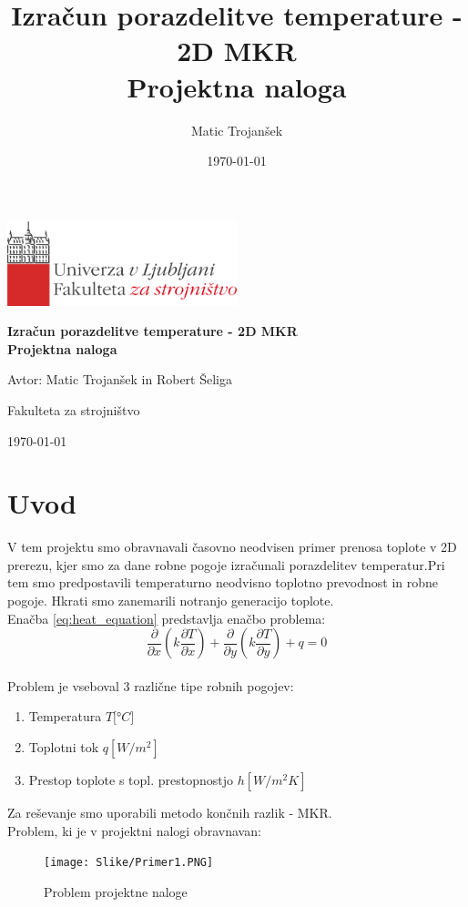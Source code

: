 \documentclass[a4paper,12pt]{article}
\title{Izračun porazdelitve temperature - 2D MKR\\Projektna naloga}
\author{Matic Trojanšek}
\date{\today}
\begin{document}
\begin{titlepage}
    \centering
    \includegraphics[width=0.5\textwidth]{Slike/ULFS_LOGO.png}\par
    \vspace{1cm}
    {\scshape\LARGE \par}
    \vspace{2cm}
    {\huge\bfseries Izračun porazdelitve temperature - 2D MKR\\Projektna naloga \par}
    \vspace{2cm}
    {\Large Avtor: Matic Trojanšek in Robert Šeliga \par}
    \vspace{0.5cm}
    {Fakulteta za strojništvo \par}
    \vfill
    {\large\today \par}
\end{titlepage}

\section{Uvod}

V tem projektu smo obravnavali časovno neodvisen primer prenosa toplote v 2D prerezu, kjer smo za dane robne pogoje izračunali porazdelitev temperatur.Pri tem smo predpostavili temperaturno neodvisno toplotno prevodnost in robne pogoje. Hkrati smo zanemarili notranjo generacijo toplote.\medskip\\
Enačba \ref{eq:heat_equation} predstavlja enačbo problema:
\begin{equation}\label{eq:heat_equation}
    \frac{\partial}{\partial x}\left(k \frac{\partial T}{\partial x}\right) + \frac{\partial}{\partial y}\left(k \frac{\partial T}{\partial y}\right) + q = 0
\end{equation}\medskip\\
Problem je vseboval 3 različne tipe robnih pogojev:
\begin{enumerate}
    \item Temperatura $T[$°$C]$
    \item Toplotni tok $q[W/m^2]$
    \item Prestop toplote s topl. prestopnostjo  $h[W/m^2K]$\medskip\\
\end{enumerate}
Za reševanje smo uporabili metodo končnih razlik - MKR.\medskip\\
Problem, ki je v projektni nalogi obravnavan:
\begin{figure}[h]
    \centering
    \texttt{[image: Slike/Primer1.PNG]}
    \caption{Problem projektne naloge}
    \label{fig:Primer1}
\end{figure}\newpage
\end{document}
